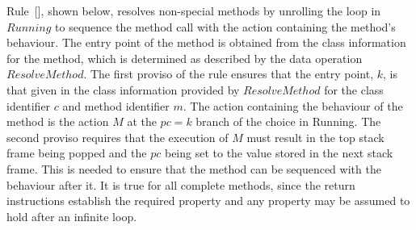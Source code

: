 Rule~[], shown below, resolves
non-special methods by unrolling the loop in $Running$ to sequence the
method call with the action containing the method's behaviour.
The entry point of the method is obtained from the class information
for the method, which is determined as described by the data operation
$ResolveMethod$.
The first proviso of the rule ensures that the entry point, $k$, is
that given in the class information provided by $ResolveMethod$ for
the class identifier $c$ and method identifier $m$.
The action containing the behaviour of the method is the action $M$ at
the $pc = k$ branch of the choice in Running.
The second proviso requires that the execution of $M$ must result in
the top stack frame being popped and the $pc$ being set to the value
stored in the next stack frame.
This is needed to ensure that the method can be sequenced with the
behaviour after it.
It is true for all complete methods, since the return instructions
establish the required property and any property may be assumed to
hold after an infinite loop.
